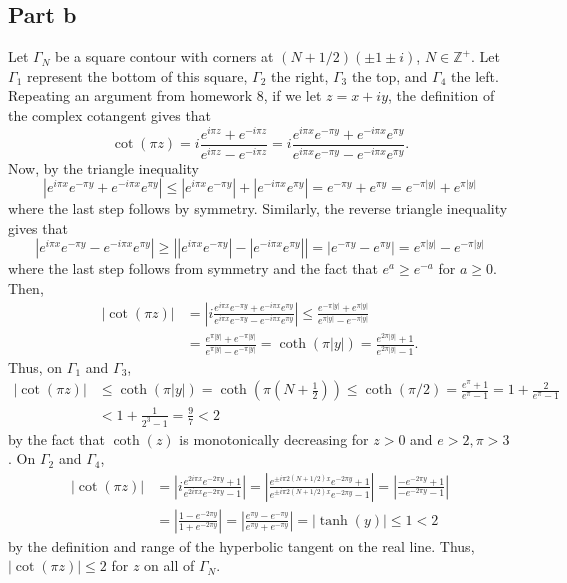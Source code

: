 \documentclass{article}
\begin{document}
\subsection{Part b}
Let $\Gamma_N$ be a square contour with corners at $(N+1/2)(\pm 1\pm i)$, $N \in \mathbb{Z}^+$. Let $\Gamma_1$ represent the bottom of this square, $\Gamma_2$ the right, $\Gamma_3$ the top, and $\Gamma_4$ the left. Repeating an argument from homework 8, if we let $z=x+iy$, the definition of the complex cotangent gives that
\[
\cot(\pi z)=i\frac{e^{i\pi z}+e^{-i\pi z}}{e^{i\pi z}-e^{-i\pi z}}= i\frac{e^{i\pi x}e^{-\pi y}+e^{-i\pi x}e^{\pi y}}{e^{i\pi x}e^{-\pi y}-e^{-i\pi x}e^{\pi y}}.
\]
Now, by the triangle inequality
\[
|e^{i\pi x}e^{-\pi y}+e^{-i\pi x}e^{\pi y}|\leq|e^{i\pi x}e^{-\pi y}|+|e^{-i\pi x}e^{\pi y}|=e^{-\pi y}+e^{\pi y}=e^{-\pi |y|}+e^{\pi |y|}
\]
where the last step follows by symmetry. Similarly, the reverse triangle inequality gives that 
\[
|e^{i\pi x}e^{-\pi y}-e^{-i\pi x}e^{\pi y}|\geq\left||e^{i\pi x}e^{-\pi y}|-|e^{-i\pi x}e^{\pi y}|\right|=|e^{-\pi y}-e^{\pi y}|=e^{\pi |y|}-e^{-\pi |y|}
\]
where the last step follows from symmetry and the fact that $e^a\geq e^{-a}$ for $a\geq0$. Then, 
\begin{align*}
|\cot(\pi z)|&=\left|i\frac{e^{i\pi x}e^{-\pi y}+e^{-i\pi x}e^{\pi y}}{e^{i\pi x}e^{-\pi y}-e^{-i\pi x}e^{\pi y}}\right|\leq\frac{e^{-\pi |y|}+e^{\pi |y|}}{e^{\pi |y|}-e^{-\pi |y|}}\\&=
\frac{e^{\pi |y|}+e^{-\pi |y|}}{e^{\pi |y|}-e^{-\pi |y|}}=\coth(\pi|y|)=\frac{e^{2\pi |y|}+1}{e^{2\pi |y|}-1}.
\end{align*} 
Thus, on $\Gamma_1$ and $\Gamma_3$, 
\begin{align*}
|\cot(\pi z)|&\leq\coth(\pi|y|)=\coth(\pi(N+\frac{1}{2}))\leq\coth(\pi/2)=\frac{e^\pi+1}{e^\pi-1}=1+\frac{2}{e^\pi-1}\\&<
1+\frac{1}{2^3-1}=\frac{9}{7}<2
\end{align*}
by the fact that $\coth(z)$ is monotonically  decreasing for $z>0$ and $e>2,\pi>3$. 
On $\Gamma_2$ and $\Gamma_4$, 
\begin{align*}
|\cot(\pi z)|&=\left|i\frac{e^{2i\pi x}e^{-2\pi y}+1}{e^{2i\pi x}e^{-2\pi y}-1}\right|=\left|\frac{e^{\pm i\pi2(N+1/2) x}e^{-2\pi y}+1}{e^{\pm i\pi2(N+1/2) x}e^{-2\pi y}-1}\right|=\left|\frac{-e^{-2\pi y}+1}{-e^{-2\pi y}-1}\right|\\&=
\left|\frac{1-e^{-2\pi y}}{1+e^{-2\pi y}}\right|=\left|\frac{e^{\pi y}-e^{-\pi y}}{e^{\pi y}+e^{-\pi y}}\right|=|\tanh(y)|\leq1<2
\end{align*}
by the definition and range of the hyperbolic tangent on the real line. 
Thus, $|\cot(\pi z)|\leq2$ for $z$ on all of $\Gamma_N$. 
\end{document}

